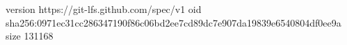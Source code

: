 version https://git-lfs.github.com/spec/v1
oid sha256:0971ec31cc286347190f86c06bd2ee7cd89dc7e907da19839e6540804df0ee9a
size 131168
